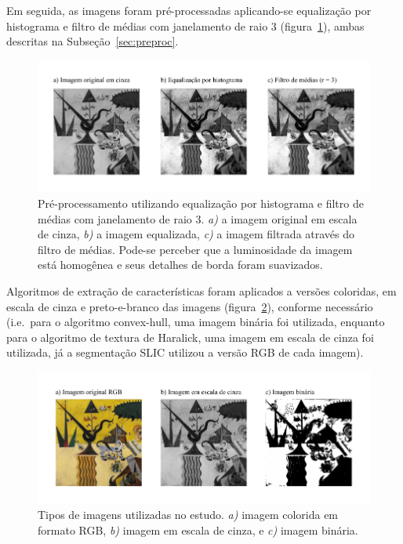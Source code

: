 Em seguida, as imagens foram pré-processadas aplicando-se equalização
por histograma e filtro de médias com janelamento de raio 3
(figura~\ref{fig:eq}), ambas descritas na Subseção~\ref{sec:preproc}.

\begin{figure}[ht!]
\begin{center}
         \caption{Pré-processamento utilizando equalização por histograma
        e filtro de médias com janelamento de raio 3. \textit{a)} a
        imagem original em escala de cinza, \textit{b)} a imagem
        equalizada, \textit{c)} a imagem filtrada através do filtro de
        médias. Pode-se perceber que a luminosidade da imagem está
        homogênea e seus detalhes de borda foram suavizados.}
        \label{fig:eq}
        \includegraphics[scale=1.2]{figs/passos_eq}
     \fonteminha
\end{center}
\end{figure}

Algoritmos de extração de características foram aplicados a versões
coloridas, em escala de cinza e preto-e-branco das imagens
(figura~\ref{fig:tipos}), conforme necessário (i.e.\ para o algoritmo
convex-hull, uma imagem binária foi utilizada, enquanto para o
algoritmo de textura de Haralick, uma imagem em escala de cinza foi
utilizada, já a segmentação SLIC utilizou a versão RGB de cada
imagem).

\begin{figure}[ht!]
\begin{center}
         \caption{Tipos de imagens utilizadas no estudo. \textit{a)}
        imagem colorida em formato RGB, \textit{b)} imagem em
        escala de cinza, e \textit{c)} imagem binária.}
        \label{fig:tipos}
        \includegraphics[scale=1.2]{figs/passos_tipos}
       \fonteminha
\end{center}
\end{figure}

